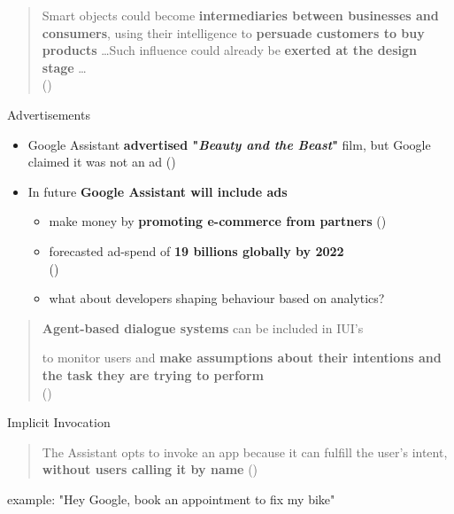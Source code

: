 \documentclass{beamer}
\begin{document}
\begin{frame}[allowframebreaks]
\begin{quote}
Smart objects could become \textbf{intermediaries between businesses and consumers}, using their intelligence to \textbf{persuade customers to buy products} \dots Such influence could already be \textbf{exerted at the design stage} \dots\\(\cite{brey2005freedom})
\end{quote}

\begin{block}{Advertisements}
	\begin{itemize}
		\item Google Assistant \textbf{advertised "\emph{Beauty and the Beast}"} film, but Google claimed it was not an ad (\cite{androidPolice})
		\medskip
		\item In future \textbf{Google Assistant will include ads}
			\begin{itemize}
				\item make money by \textbf{promoting e-commerce from partners} (\cite{recode})
				\smallskip
				\item forecasted ad-spend of \textbf{19 billions globally by 2022}
				\\(\cite{juniper})
				\smallskip
				\item what about developers shaping behaviour based on analytics?
			\end{itemize}
	\end{itemize}
\end{block}

\framebreak

\begin{quote}
	\textbf{Agent-based dialogue systems} can be included in IUI’s

	to monitor users and \textbf{make assumptions about their intentions and the task they are trying to perform} \\(\cite{brey2005freedom})
\end{quote}
\medskip

\begin{block}{Implicit Invocation}
\begin{quote}
The Assistant opts to invoke an app because it can fulfill the user's intent, \textbf{without users calling it by name} (\cite{googleactions})
\end{quote}

\bigskip
example: "Hey Google, book an appointment to fix my bike"
\end{block}
\end{frame}
\end{document}
